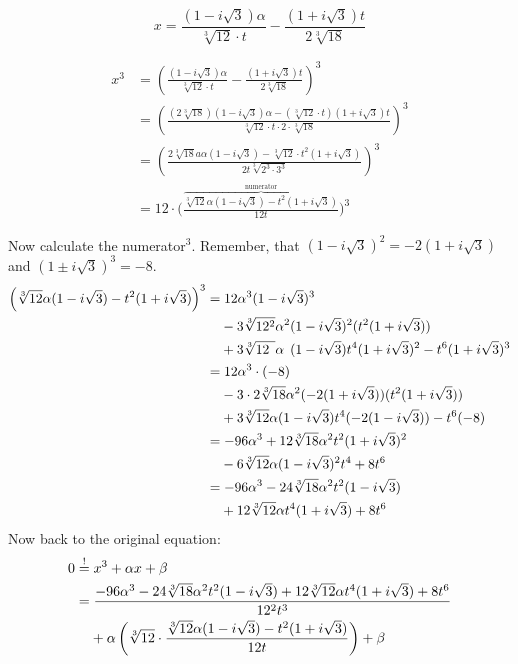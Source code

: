 
\[x = \frac{(1-i \sqrt{3}) \alpha}{\sqrt[3]{12} \cdot t}
     -\frac{(1+i\sqrt{3}) t}{2\sqrt[3]{18}}\]

\begin{align}
    x^3 &= \left (\frac{(1-i \sqrt{3}) \alpha}{\sqrt[3]{12} \cdot t} - \frac{(1+i\sqrt{3}) t}{2\sqrt[3]{18}} \right)^3\\
    &= \left (\frac{(2\sqrt[3]{18})(1-i \sqrt{3}) \alpha - (\sqrt[3]{12} \cdot t)(1+i\sqrt{3}) t}{\sqrt[3]{12} \cdot t \cdot 2 \cdot \sqrt[3]{18}} \right)^3\\
    &= \left (\frac{2\sqrt[3]{18}a \alpha (1-i \sqrt{3}) - \sqrt[3]{12} \cdot t^2(1+i\sqrt{3})}{2t \sqrt[3]{2^3 \cdot 3^3}} \right )^3\\
    &= 12 \cdot \bigg (\frac{\overbrace{\sqrt[3]{12} \alpha (1-i \sqrt{3}) - t^2(1+i\sqrt{3})}^{\text{numerator}}}{12t} \bigg )^3
\end{align}

Now calculate the numerator$^3$. Remember, that $(1-i \sqrt{3})^2 = -2 (1+i \sqrt{3})$
and $(1 \pm i \sqrt{3})^3 = -8$.
\begin{align}
    \left (\sqrt[3]{12} \alpha (1-i \sqrt{3}) - t^2(1+i\sqrt{3}) \right )^3 &= 
    12 \alpha^3 (1-i\sqrt{3})^3 \\
    &\hphantom{{}=}- 3 \sqrt[3]{12^2} \alpha^2(1-i\sqrt{3})^2 (t^2(1+i \sqrt{3}))\\
    &\hphantom{{}=}+ 3 \sqrt[3]{12\hphantom{^2}} \alpha\hphantom{^2} (1-i\sqrt{3}) t^4 (1+i\sqrt{3})^2 - t^6 (1+i\sqrt{3})^3\\
    &= 12 \alpha^3 \cdot (-8) \\
    &\hphantom{{}=}- 3 \cdot 2 \sqrt[3]{18} \alpha^2(-2(1+i\sqrt{3}))(t^2(1+i \sqrt{3}))\\
    &\hphantom{{}=}+ 3 \sqrt[3]{12} \alpha (1-i\sqrt{3}) t^4 (-2(1-i\sqrt{3})) - t^6 (-8)\\
    &= -96 \alpha^3 + 12 \sqrt[3]{18} \alpha^2 t^2 (1+i \sqrt{3})^2\\
    &\hphantom{{}=}- 6 \sqrt[3]{12} \alpha (1-i\sqrt{3})^2 t^4 +8 t^6\\
    &= -96 \alpha^3 - 24 \sqrt[3]{18} \alpha^2 t^2 (1-i \sqrt{3})\\
    &\hphantom{{}=}+ 12 \sqrt[3]{12} \alpha t^4 (1+i \sqrt{3}) +8 t^6
\end{align}
\goodbreak
Now back to the original equation:
\begin{align}
0 &\stackrel{!}{=} x^3 + \alpha x + \beta\\
  &= \frac{-96 \alpha^3 - 24 \sqrt[3]{18} \alpha^2 t^2 (1-i \sqrt{3}) + 12 \sqrt[3]{12} \alpha t^4 (1+i \sqrt{3}) +8 t^6}{12^2 t^3}\\
  &\hphantom{{}=}+\alpha \left (\sqrt[3]{12} \cdot \frac{\sqrt[3]{12} \alpha (1-i \sqrt{3}) - t^2(1+i\sqrt{3})}{12t} \right ) + \beta
\end{align}

